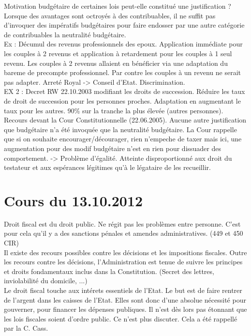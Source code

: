 \documentclass{book}
\begin{document}
Motivation budgétaire de certaines lois peut-elle constitué une justification ? Lorsque des avantages sont octroyés à des contribuables, il ne suffit pas d'invoquer des impératifs budgétaires pour faire endosser par une autre catégorie de contribuables la neutralité budgétaire.\\

Ex : Décumul des revenus professionnels des epoux. Application immédiate pour les couples à 2 revenus et application à retardement pour les couples à 1 seul revenu. Les couples à 2 revenus allaient en bénéficier via une adaptation du bareme de precompte professionnel. Par contre les couples à un revenu ne serait pas adapter. Arreté Royal -> Conseil d'Etat. Discrimination.\\

EX 2 : Decret RW 22.10.2003 modifiant les droits de succession. Réduire les taux de droit de succession pour les personnes proches. Adaptation en augmentant le taux pour les autres. 90\% sur la tranche la plus élevée (autres personnes). Recours devant la Cour Constitutionnelle (22.06.2005). Aucune autre justification que budgétaire n'a  été invoquée que la neutralité budgétaire. La Cour rappelle que si on souhaite encourager/décourager, rien n'empeche de taxer mais ici, une augmentation pour des modif budgétaire n'est en rien pour dissuader des comportement. -> Problème d'égalité. Atteinte disproportionné aux droit du testateur et aux espérances légitimes qu'à le légataire de les recueillir.\\

\chapter{Cours du 13.10.2012}

Droit fiscal est du droit public. Ne régit pas les problèmes entre personne. C'est pour cela qu'il y a des sanctions pénales et amendes administratives. (449 et 450 CIR)\\

Il existe des recours possibles contre les décisions et les impositions fiscales. Outre les recours contre les décisions, l'Administration est tenue de suivre les principes et droits fondamentaux inclus dans la Constitution. (Secret des lettres, inviolabilité du domicile, ...)\\

Le droit fiscal touche aux intérets essentiels de l'Etat. Le but est de faire rentrer de l'argent dans les caisses de l'Etat. Elles sont donc d'une absolue nécessité pour gouverner, pour financer les dépenses publiques. Il n'est dès lors pas étonnant que les lois fiscales soient d'ordre public. Ce n'est plus discuter. Cela a été rappellé par la C. Cass.
\end{document}

